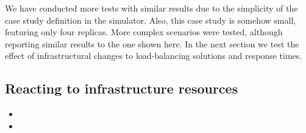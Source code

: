 We have conducted more tests with similar results due to the
simplicity of the case study definition in the simulator. Also, this
case study is somehow small, featuring only four replicas. More
complex scenarios were tested, although reporting similar results to
the one shown here. In the next section we test the effect of
infrastructural changes to load-balancing solutions and response
times.

\subsection{Reacting to infrastructure resources}

\begin{itemize}
\item {}
\item {}
\end{itemize}

